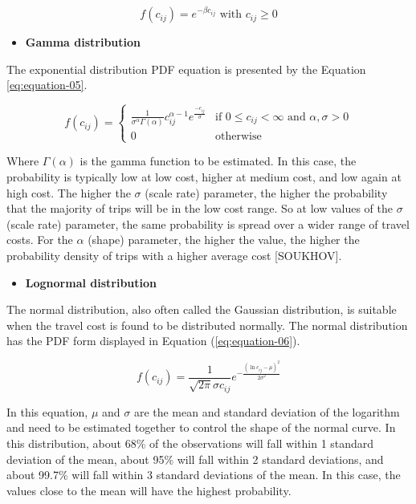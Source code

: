 \documentclass[preprint, 3p,
authoryear]{elsarticle} %
\providecommand{\tightlist}{%
  \setlength{\itemsep}{0pt}\setlength{\parskip}{0pt}}
\begin{document}
\begin{equation}
f(c_{ij}) = e^{-\beta c_{ij}} \text{ with } c_{ij} \ge 0
\label{eq:equation-04}
\end{equation}

\begin{itemize}
\tightlist
\item
  \textbf{Gamma distribution}
\end{itemize}

The exponential distribution PDF equation is presented by the Equation
\ref{eq:equation-05}.

\begin{equation}
f(c_{ij}) = 
   \begin{cases}
\frac{1}{\sigma^\alpha\Gamma(\alpha)} c_{ij}^{\alpha-1} e^{\frac{-c_{ij}}{\sigma}} & \text{if } 0 \leq c_{ij} <      \infty  \text{ and } \alpha, \sigma > 0 \\ 0 & \text{otherwise}
   \end{cases}
\label{eq:equation-05}
\end{equation}

Where \(\Gamma(\alpha)\) is the gamma function to be estimated. In this
case, the probability is typically low at low cost, higher at medium
cost, and low again at high cost. The higher the \(\sigma\) (scale rate)
parameter, the higher the probability that the majority of trips will be
in the low cost range. So at low values of the \(\sigma\) (scale rate)
parameter, the same probability is spread over a wider range of travel
costs. For the \(\alpha\) (shape) parameter, the higher the value, the
higher the probability density of trips with a higher average cost
{[}SOUKHOV{]}.

\begin{itemize}
\tightlist
\item
  \textbf{Lognormal distribution}
\end{itemize}

The normal distribution, also often called the Gaussian distribution, is
suitable when the travel cost is found to be distributed normally. The
normal distribution has the PDF form displayed in Equation
(\ref{eq:equation-06}).

\begin{equation}
f(c_{ij}) = \frac{1}{\sqrt{2\pi} \sigma c_{ij}} e^{-\frac{(\ln c_{ij} - \mu)^2}{2\sigma^2}}
\label{eq:equation-06}
\end{equation}

In this equation, \(\mu\) and \(\sigma\) are the mean and standard
deviation of the logarithm and need to be estimated together to control
the shape of the normal curve. In this distribution, about 68\% of the
observations will fall within 1 standard deviation of the mean, about
95\% will fall within 2 standard deviations, and about 99.7\% will fall
within 3 standard deviations of the mean. In this case, the values close
to the mean will have the highest probability.
\end{document}
